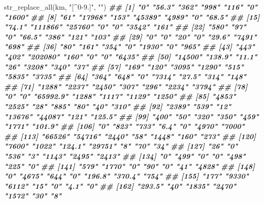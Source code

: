 \documentclass[
  ngerman,
]{article}
\newenvironment{Shaded}{\begin{snugshade}}{\end{snugshade}}
\newcommand{\DocumentationTok}[1]{\textcolor[rgb]{0.56,0.35,0.01}{\textbf{\textit{#1}}}}
\newcommand{\FunctionTok}[1]{\textcolor[rgb]{0.00,0.00,0.00}{#1}}
\newcommand{\NormalTok}[1]{#1}
\newcommand{\StringTok}[1]{\textcolor[rgb]{0.31,0.60,0.02}{#1}}
\begin{document}
\begin{Shaded}
\begin{Highlighting}[]
\FunctionTok{str\_replace\_all}\NormalTok{(km, }\StringTok{"[\^{}0{-}9.]"}\NormalTok{, }\StringTok{""}\NormalTok{)}
\DocumentationTok{\#\#   [1] "0"       "56.3"    "362"     "998"     "116"     "0"       "1600"   }
\DocumentationTok{\#\#   [8] "61"      "17968"   "153"     "45389"   "4989"    "0"       "68.5"   }
\DocumentationTok{\#\#  [15] "74.1"    "111866"  "25760"   "0"       "0"       "3542"    "161"    }
\DocumentationTok{\#\#  [22] "580"     "97"      "0"       "66.5"    "386"     "121"     "103"    }
\DocumentationTok{\#\#  [29] "0"       "0"       "20"      "0"       "29.6"    "7491"    "698"    }
\DocumentationTok{\#\#  [36] "80"      "161"     "354"     "0"       "1930"    "0"       "965"    }
\DocumentationTok{\#\#  [43] "443"     "402"     "202080"  "160"     "0"       "0"       "6435"   }
\DocumentationTok{\#\#  [50] "14500"   "138.9"   "11.1"    "26"      "3208"    "340"     "37"     }
\DocumentationTok{\#\#  [57] "169"     "120"     "3095"    "1290"    "515"     "5835"    "3735"   }
\DocumentationTok{\#\#  [64] "364"     "648"     "0"       "7314"    "27.5"    "314"     "148"    }
\DocumentationTok{\#\#  [71] "1288"    "2237"    "2450"    "307"     "296"     "2234"    "3794"   }
\DocumentationTok{\#\#  [78] "0"       "0"       "65992.9" "1288"    "1117"    "1129"    "1250"   }
\DocumentationTok{\#\#  [85] "4853"    "2525"    "28"      "885"     "80"      "40"      "310"    }
\DocumentationTok{\#\#  [92] "2389"    "539"     "12"      "13676"   "44087"   "121"     "125.5"  }
\DocumentationTok{\#\#  [99] "400"     "50"      "320"     "350"     "459"     "1771"    "101.9"  }
\DocumentationTok{\#\# [106] "0"       "823"     "733"     "6.4"     "0"       "4970"    "7000"   }
\DocumentationTok{\#\# [113] "66526"   "54716"   "2440"    "58"      "1448"    "160"     "273"    }
\DocumentationTok{\#\# [120] "7600"    "1022"    "124.1"   "29751"   "8"       "70"      "34"     }
\DocumentationTok{\#\# [127] "26"      "0"       "536"     "3"       "1143"    "2495"    "2413"   }
\DocumentationTok{\#\# [134] "0"       "499"     "0"       "0"       "498"     "225"     "0"      }
\DocumentationTok{\#\# [141] "579"     "1770"    "0"       "90"      "0"       "41"      "4828"   }
\DocumentationTok{\#\# [148] "0"       "4675"    "644"     "0"       "196.8"   "370.4"   "754"    }
\DocumentationTok{\#\# [155] "177"     "9330"    "6112"    "15"      "0"       "4.1"     "0"      }
\DocumentationTok{\#\# [162] "293.5"   "40"      "1835"    "2470"    "1572"    "30"      "8"      }

\end{Highlighting}
\end{Shaded}
\end{document}
